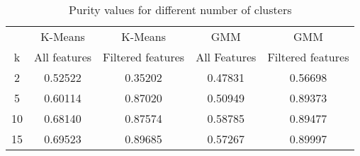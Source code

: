 \documentclass[12pt]{article}
\begin{document}
\begin{table}[h]
\centering
\begin{tabular}{ c | c | c | c | c}
  \hline
   & K-Means & K-Means & GMM & GMM\\
  k & All features & Filtered features & All Features & Filtered features \\
  \hline
  2 &   0.52522 & 0.35202 & 0.47831 & 0.56698 \\
  5 &   0.60114 & 0.87020 & 0.50949 & 0.89373 \\
  10 &  0.68140 & 0.87574 & 0.58785 & 0.89477 \\
  15 &  0.69523 & 0.89685 & 0.57267 & 0.89997 \\
  \hline  
\end{tabular}
\caption{Purity values for different number of clusters}
\label{tbl:kpurity}
\end{table}
\end{document}
